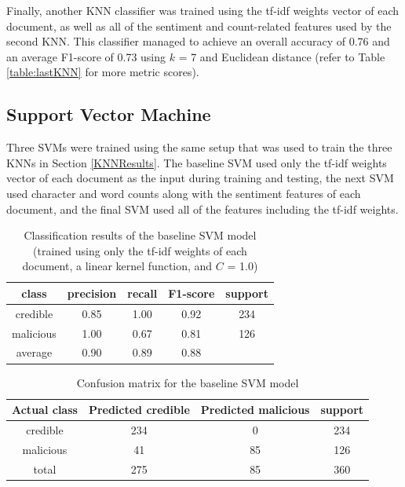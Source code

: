Finally, another KNN classifier was trained using the tf-idf weights vector of each document, as well as all of the sentiment and count-related features used by the second KNN.  This classifier managed to achieve an overall accuracy of 0.76 and an average F1-score of 0.73 using $k$ = 7 and Euclidean distance (refer to Table \ref{table:lastKNN} for more metric scores).


\subsection{Support Vector Machine} \label{SVMResults}

Three SVMs were trained using the same setup that was used to train the three KNNs in Section \ref{KNNResults}.  The baseline SVM used only the tf-idf weights vector of each document as the input during training and testing, the next SVM used character and word counts along with the sentiment features of each document, and the final SVM used all of the features including the tf-idf weights.


\begin{table}[h]
\centering
\begin{tabular}{|c | c  c  c | c|}
\hline
class      & precision & recall & F1-score & support\\
\hline
credible   & 0.85      & 1.00   & 0.92     & 234    \\
malicious  & 1.00      & 0.67   & 0.81     & 126    \\
\hline
average    & 0.90      & 0.89   & 0.88     &   \\
\hline
\end{tabular}
\caption[Baseline SVM's Classification Report]{Classification results of the baseline SVM model (trained using only the tf-idf weights of each document, a linear kernel function, and $C$ = 1.0)}
\label{table:baselineSVM}
\end{table}


\begin{table}[h]
\centering
\begin{tabular}{|c | c  c | c|}
\hline
                Actual class & 
                Predicted credible 
                &   
                Predicted malicious
                & support\\
\hline
credible   & 234                & 0                   & 234\\
malicious  & 41                 & 85                  & 126\\
\hline
total      & 275                & 85                  & 360\\
\hline
\end{tabular}
\caption[Baseline SVM's Confusion Matrix]{Confusion matrix for the baseline SVM model}
\label{table:baselineSVMConfusion}
\end{table}


